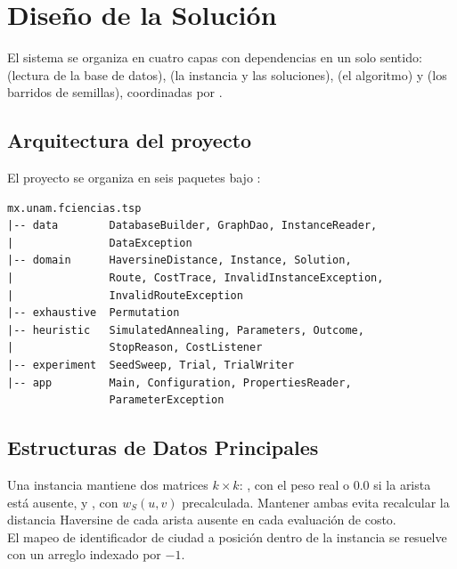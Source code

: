 \documentclass[9pt,a4paper,twocolumn,twoside]{tau-class/tau}
\begin{document}
\section{Diseño de la Solución}\label{sec:diseno}

El sistema se organiza en cuatro capas con dependencias en un solo sentido:  (lectura de la base de datos),  (la instancia y las soluciones),  (el algoritmo) y  (los barridos de semillas), coordinadas por .


    \subsection{Arquitectura del proyecto}

    El proyecto se organiza en seis paquetes bajo :

    \begin{verbatim}
mx.unam.fciencias.tsp
|-- data        DatabaseBuilder, GraphDao, InstanceReader,
|               DataException
|-- domain      HaversineDistance, Instance, Solution,
|               Route, CostTrace, InvalidInstanceException,
|               InvalidRouteException
|-- exhaustive  Permutation
|-- heuristic   SimulatedAnnealing, Parameters, Outcome,
|               StopReason, CostListener
|-- experiment  SeedSweep, Trial, TrialWriter
|-- app         Main, Configuration, PropertiesReader,
                ParameterException
    \end{verbatim}

    \subsection{Estructuras de Datos Principales}

    Una instancia mantiene \textit{}{dos} matrices $k\times k$: , con el peso real o $0.0$ si la arista está ausente, y , con $w_S(u,v)$ precalculada. Mantener ambas evita recalcular la distancia Haversine de cada arista ausente en cada evaluación de costo.\\

    El mapeo de identificador de ciudad a posición dentro de la instancia se resuelve con un arreglo indexado por $-1$.\\
    
\end{document}
